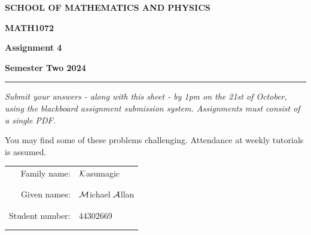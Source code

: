 \documentclass[a4paper, 11pt]{report}
\begin{document}
\begin{center}
{\bf SCHOOL OF MATHEMATICS AND PHYSICS}
\end{center}
\centerline{\large\bf MATH1072}
\vspace{.1cm}   
\centerline{\large\bf Assignment 4}
\vspace{.1cm}
\centerline{\large\bf Semester Two 2024}

\vspace{3mm}
\hrule
\vspace{3mm}

{\it Submit your answers - along with this sheet - by 1pm on the 21st of October, using the blackboard assignment submission system. Assignments must consist of a single PDF.
}

You may find some of these problems challenging. Attendance at weekly tutorials is assumed.

\vspace{1cm}

\begin{tabular}{rl}
Family name: & $\mathcal{K}$asumagic\\
& \\
& \\
Given names: & $\mathcal{M}$ichael $\mathcal{A}$llan\\
& \\
& \\
Student number: & 44302669 \\
& \\
& \\
\end{tabular}
\end{document}
